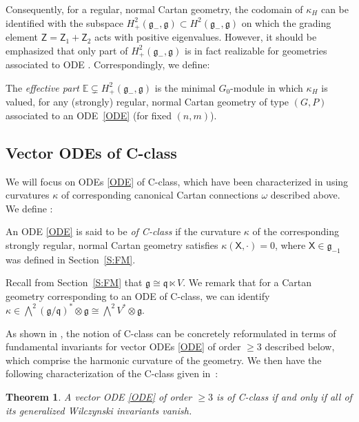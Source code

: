 \documentclass[10pt,a4paper]{amsart}
\newcommand\tensor{\otimes}
\newcommand{\g}{\mathfrak{g}}
\newcommand\fg{\mathfrak{g}}
\newcommand\fq {\mathfrak{q}}
\newcommand\bbE{\mathbb{E}}
\newcommand\sfX{\mathsf{X}}
\newcommand\sfZ{\mathsf{Z}}
\numberwithin{equation}{section}
\newtheorem{Theorem}{Theorem}[section]
\begin{document}
Consequently, for a regular, normal Cartan geometry, the codomain of $\kappa_H$ can be identified with the subspace $H^2_+(\g_-,\g) \subset H^2(\fg_-,\fg)$ on which the grading element $\sfZ = \sfZ_1 + \sfZ_2$ acts with positive eigenvalues. However, it should be emphasized that only part of $H^2_+(\g_-,\g)$ is in fact realizable for geometries associated to ODE \cite{DM2014, Medvedev2010}. Correspondingly, we define:

\begin{Definition}\label{D:E} The {\em effective part} $\bbE \subsetneq H^2_+(\g_{-},\g)$ is the minimal $G_{0}$-module in which $\kappa_H$ is valued, for any (strongly) regular, normal Cartan geometry of type $(G, P)$ associated to an ODE~\eqref{ODE} (for fixed $(n,m)$).
\end{Definition}


\subsection{Vector ODEs of C-class} \label{S: C-class}

We will focus on ODEs \eqref{ODE} of C-class, which have been characterized in \cite{CDT2020} using curvatures $\kappa$ of corresponding canonical Cartan connections $\omega$ described above. We define \cite[Definition~2.4]{CDT2020}:
\begin{Definition} \label{D:C-class}
An ODE \eqref{ODE} is said to be {\em of C-class} if the curvature $\kappa$ of the corresponding strongly regular, normal Cartan geometry satisfies $\kappa(\sfX,\cdot) = 0$, where $\sfX \in \g_{-1}$ was defined in Section~\ref{S:FM}.
\end{Definition}

\begin{Remark}\label{R:kC-class}
Recall from Section~\ref{S:FM} that $\g \cong \fq \ltimes V$. We remark that for a Cartan geometry corresponding to an ODE of C-class, we can identify $\kappa \in \bigwedge^2 (\g / \fq)^*\otimes \fg \cong \bigwedge^2 V^\ast \tensor \g$.
\end{Remark}


As shown in \cite{CDT2020}, the notion of C-class can be concretely reformulated in terms of fundamental invariants for vector ODEs \eqref{ODE} of order $\ge 3$ described below, which comprise the harmonic curvature of the geometry. We then have the following characterization of the C-class given in~\cite[Theorems~4.1 and~4.2]{CDT2020}:
\begin{Theorem} A vector ODE \eqref{ODE} of order $\geq 3$ is of C-class if and only if all of its generalized Wilczynski invariants vanish.
\end{Theorem}
\end{document}
